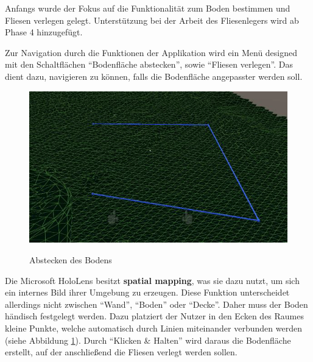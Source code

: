 Anfangs wurde der Fokus auf die Funktionalität zum Boden bestimmen und Fliesen verlegen gelegt. Unterstützung bei der Arbeit des Fliesenlegers wird ab Phase 4 hinzugefügt. 

Zur Navigation durch die Funktionen der Applikation wird ein Menü designed mit den Schaltflächen \enquote{Bodenfläche abstecken}, sowie \enquote{Fliesen verlegen}. Das dient dazu, navigieren zu können, falls die Bodenfläche angepasster werden soll.

\begin{figure}[h]
	\begin{center}
		\noindent\includegraphics[scale=0.7]{Resources/Artefakt/bodenAbstecken.png}
		\label{abstecken}
		\caption{Abstecken des Bodens}	
	\end{center}
\end{figure}

Die Microsoft HoloLens besitzt \textbf{spatial mapping}, was sie dazu nutzt, um sich ein internes Bild ihrer Umgebung zu erzeugen. Diese Funktion unterscheidet allerdings nicht zwischen \enquote{Wand}, \enquote{Boden} oder \enquote{Decke}. Daher muss der Boden händisch festgelegt werden. Dazu platziert der Nutzer in den Ecken des Raumes kleine Punkte, welche automatisch durch Linien miteinander verbunden werden (siehe Abbildung \ref{abstecken}). Durch \enquote{Klicken \& Halten} wird daraus die Bodenfläche erstellt, auf der anschließend die Fliesen verlegt werden sollen.

